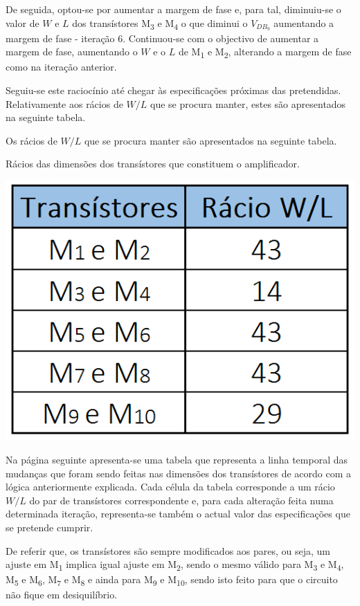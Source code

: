 \documentclass[11pt]{article}
\numberwithin{equation}{section}
\begin{document}
De seguida, optou-se por aumentar a margem de fase e, para tal, diminuiu-se o valor de $W$ e $L$ dos transístores M\textsubscript{3} e M\textsubscript{4} o que diminui o $V_{DB_9}$ aumentando a margem de fase - iteração 6. Continuou-se com o objectivo de aumentar a margem de fase, aumentando o $W$ e o $L$ de M\textsubscript{1} e M\textsubscript{2}, alterando a margem de fase como na iteração anterior.

Seguiu-se este raciocínio até chegar às especificações próximas das pretendidas. Relativamente aos rácios de $W/L$ que se procura manter, estes são apresentados na seguinte tabela.
         
Os rácios de $W/L$ que se procura manter são apresentados na seguinte tabela.

\begin{table}[H]
	\centering
	\caption{Rácios das dimensões dos transístores que constituem o amplificador.}
	\vspace{-1.5mm}
	\includegraphics[keepaspectratio=true, scale=0.33]{teoricas/racios}
\end{table}

Na página seguinte apresenta-se uma tabela que representa a linha temporal das mudanças que foram sendo feitas nas dimensões dos transístores de acordo com a lógica anteriormente explicada. Cada célula da tabela corresponde a um rácio $W/L$ do par de transístores correspondente e, para cada alteração feita numa determinada iteração, representa-se também o actual valor das especificações que se pretende cumprir.

De referir que, os transístores são sempre modificados aos pares, ou seja, um ajuste em M\textsubscript{1} implica igual ajuste em M\textsubscript{2}, sendo o mesmo válido para M\textsubscript{3} e M\textsubscript{4}, M\textsubscript{5} e M\textsubscript{6}, M\textsubscript{7} e M\textsubscript{8} e ainda para M\textsubscript{9} e M\textsubscript{10}, sendo isto feito para que o circuito não fique em desiquilíbrio.
\end{document}
